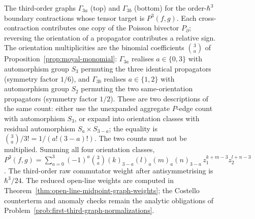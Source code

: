 \documentclass[11pt]{memoir}
\begin{document}
\begin{figure}[H]
	  \caption{The third-order graphs $\Gamma_{3a}$ (top) and $\Gamma_{3b}$
    (bottom) for the order-$\hbar^3$ boundary contractions whose tensor
    target is $P^3(f,g)$. Each cross-contraction contributes one copy of
    the Poisson bivector $P_\partial$; reversing the orientation of a
    propagator contributes a relative sign. The orientation
    multiplicities are the binomial coefficients $\binom{3}{a}$ of
    Proposition~\ref{prop:moyal-monomial}: $\Gamma_{3a}$ realises
	    $a\in\{0,3\}$ with automorphism group $S_3$ permuting the three
	    identical propagators (symmetry factor $1/6$), and $\Gamma_{3b}$
	    realises $a\in\{1,2\}$ with automorphism group $S_2$ permuting the
	    two same-orientation propagators (symmetry factor $1/2$). These are
	    two descriptions of the same count: either use the unexpanded
	    aggregate \(P\)-edge count with automorphism \(S_3\), or expand into
	    orientation classes with residual automorphism \(S_a\times S_{3-a}\);
	    the equality is
	    \(\binom{3}{a}/3!=1/(a!(3-a)!)\). The two counts must not be
	    multiplied. Summing all four orientation classes,
    \(P^3(f,g)=\sum_{a=0}^{3}(-1)^a\binom{3}{a}
    (k)_{3-a}(l)_a(m)_a(n)_{3-a}\,z_1^{k+m-3}z_2^{l+n-3}\).
    The third-order raw commutator weight after antisymmetrising is
    \(\hbar^3/24\). The reduced open-line
    weights are computed in
	    Theorem~\ref{thm:open-line-midpoint-graph-weights}; the
    Costello counterterm and anomaly checks remain the analytic
    obligations of Problem~\ref{prob:first-third-graph-normalizations}.}
  \label{fig:gamma3}
\end{figure}
\end{document}
